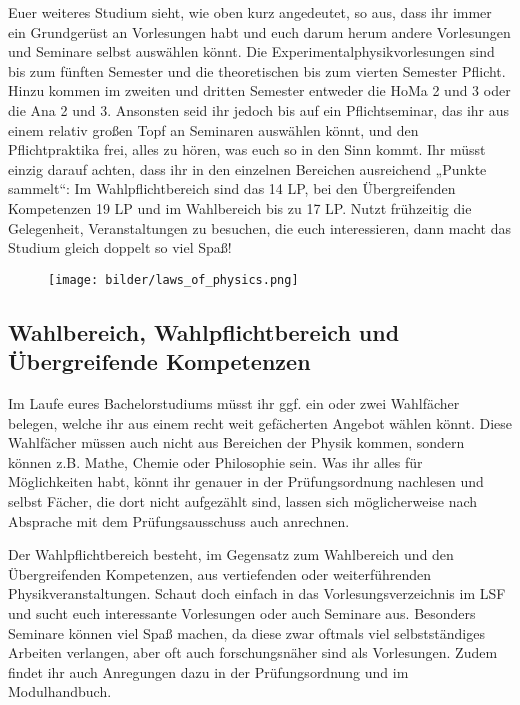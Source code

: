 Euer weiteres Studium sieht, wie oben kurz angedeutet, so aus, dass ihr immer ein Grundgerüst an Vorlesungen habt und euch darum herum andere Vorlesungen und Seminare selbst auswählen könnt. Die Experimentalphysikvorlesungen sind bis zum fünften Semester und die theoretischen bis zum vierten Semester Pflicht. Hinzu kommen im zweiten und dritten Semester entweder die \gls{HoMa} 2 und 3 oder die \gls{Ana} 2 und 3. Ansonsten seid ihr jedoch bis auf ein Pflichtseminar, das ihr aus einem relativ großen Topf an Seminaren auswählen könnt, und den Pflichtpraktika frei, alles zu hören, was euch so in den Sinn kommt. Ihr müsst einzig darauf achten, dass ihr in den einzelnen Bereichen ausreichend „Punkte sammelt“: Im Wahlpflichtbereich sind das 14 \gls{LP}, bei den Übergreifenden Kompetenzen 19 \gls{LP} und im Wahlbereich bis zu 17 \gls{LP}. Nutzt frühzeitig die Gelegenheit, Veranstaltungen zu besuchen, die euch interessieren, dann macht das Studium gleich doppelt so viel Spaß!

\begin{figure}[b]
	\centering
	\texttt{[image: bilder/laws\_of\_physics.png]}
\end{figure}
\vfill \eject

\subsection{Wahlbereich, Wahlpflichtbereich und \\Übergreifende Kompetenzen}

Im Laufe eures Bachelorstudiums müsst ihr ggf. ein oder zwei Wahlfächer belegen, welche ihr aus einem recht weit gefächerten Angebot wählen könnt. Diese Wahlfächer müssen auch nicht aus Bereichen der Physik kommen, sondern können z.B. Mathe, Chemie oder Philosophie sein. Was ihr alles für Möglichkeiten habt, könnt ihr genauer in der Prüfungsordnung nachlesen und selbst Fächer, die dort nicht aufgezählt sind, lassen sich möglicherweise nach Absprache mit dem Prüfungsausschuss auch anrechnen.

Der Wahlpflichtbereich besteht, im Gegensatz zum Wahlbereich und den Übergreifenden Kompetenzen, aus vertiefenden oder weiterführenden Physikveranstaltungen. Schaut doch einfach in das Vorlesungsverzeichnis im LSF und sucht euch interessante Vorlesungen oder auch Seminare aus. Besonders Seminare können viel Spaß machen, da diese zwar oftmals viel selbstständiges Arbeiten verlangen, aber oft auch forschungsnäher sind als Vorlesungen. Zudem findet ihr auch Anregungen dazu in der Prüfungsordnung und im Modulhandbuch.

